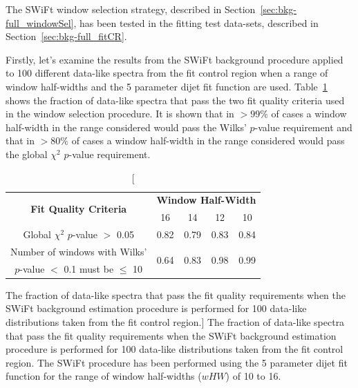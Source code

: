 The SWiFt window selection strategy, described in Section~\ref{sec:bkg-full_windowSel}, has been tested in the fitting test data-sets, described in Section~\ref{sec:bkg-full_fitCR}.


Firstly, let's examine the results from the SWiFt background procedure applied to 100 different data-like spectra from the fit control region
when a range of window half-widths and the 5 parameter dijet fit function are used.
Table~\ref{tab:windowSel_dataLike} shows the fraction of data-like spectra that pass the two fit quality criteria used in the window selection procedure.
It is shown that in $>99\%$ of cases a window half-width in the range considered would pass the Wilks' \mbox{$p$-value} requirement
and that in $>80\%$ of cases a window half-width in the range considered would pass the global $\chi^{2}$ \mbox{$p$-value} requirement.

{\renewcommand{\arraystretch}{1.3}
\begin{table}[!htb]
\centering
\begin{tabular}{|c||c|c|c|c|}
\hline
 \multirow{2}{*}{\textbf{Fit Quality Criteria}} & \multicolumn{4}{c|}{\textbf{Window Half-Width}} \\ \cline{2-5} 
                                                & 16 & 14 & 12 & 10 \\ \hline
\multirow{2}{*}{Global $\chi^2$ $p$-value $>$ 0.05} & \multirow{2}{*}{0.82} & \multirow{2}{*}{0.79} & \multirow{2}{*}{0.83} & \multirow{2}{*}{0.84} \\
 &  &  &  &  \\ \hline
Number of windows with Wilks' & \multirow{2}{*}{0.64} & \multirow{2}{*}{0.83} & \multirow{2}{*}{0.98} & \multirow{2}{*}{0.99} \\
\mbox{$p$-value} $<$ 0.1 must be $\leq$ 10 &  &  &  &  \\ \hline
\end{tabular}
\caption
    [The fraction of data-like spectra that pass the fit quality requirements when the SWiFt background estimation procedure is performed for
      100 data-like distributions taken from the \lm{} fit control region.]
    {The fraction of data-like spectra that pass the fit quality requirements when the SWiFt background estimation procedure is performed for
      100 data-like distributions taken from the \lm{} fit control region.
      The SWiFt procedure has been performed using the 5 parameter dijet fit function
      for the range of window half-widths ($wHW$) of 10 to 16.}
\label{tab:windowSel_dataLike}
\end{table}
\vspace{-1em}
}

